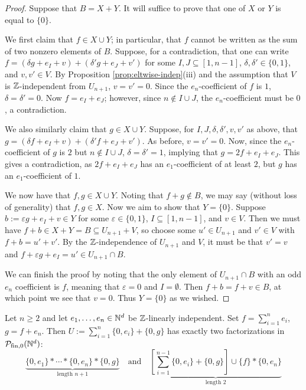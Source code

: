 \begin{proof}
	Suppose that $B = X + Y$.
	It will suffice to prove that one of $X$ or $Y$ is equal to $\{0\}$.

	We first claim that $f\in X\cup Y$; in particular, that $f$ cannot be written as the sum of two nonzero elements of $B$.
	Suppose, for a contradiction, that one can write $f = (\delta g + e_I + v) + (\delta' g + e_J + v')$ for some $I,J\subseteq [1,n-1]$, $\delta,\delta'\in\{0,1\}$, and $v,v'\in V$.
	By Proposition \ref{prop:eltwise-indep}(iii) and the assumption that $V$ is $\mathbb{Z}$-independent from $U_{n+1}$, $v=v' = 0$.
	Since the $e_n$-coefficient of $f$ is $1$, $\delta = \delta' = 0$.
	Now $f = e_I + e_J$; however, since $n\notin I\cup J$, the $e_n$-coefficient must be $0$, a contradiction.
	
	We also similarly claim that $g \in X\cup Y$.  
	Suppose, for $I,J,\delta,\delta',v,v'$ as above, that $g = (\delta f + e_I + v) + (\delta' f + e_J + v')$.
	As before, $v=v'=0$.
	Now, since the $e_n$-coefficient of $g$ is $2$ but $n\notin I\cup J$, $\delta = \delta' = 1$, implying that $g = 2f + e_I + e_J$.
	This gives a contradiction, as $2f + e_I + e_J$ has an $e_1$-coefficient of at least $2$, but $g$ has an $e_1$-coefficient of $1$.
	
	We now have that $f,g\in X \cup Y$.
	Noting that $f+g \notin B$, we may say (without loss of generality) that $f,g\in X$.
	Now we aim to show that $Y = \{0\}$.
	Suppose $b := \varepsilon g + e_I +v \in Y$ for some $\varepsilon \in \{0,1\}$, $I\subseteq [ 1,n-1]$, and $v\in V$.
	Then we must have $f + b \in X+Y = B \subseteq U_{n+1} + V$, so choose some $u'\in U_{n+1}$ and $v'\in V$ with $f + b = u' + v'$.
	By the $\mathbb{Z}$-independence of $U_{n+1}$ and $V$, it must be that $v' = v$ and $f + \varepsilon g + e_I = u' \in U_{n+1} \cap B$.
	
	We can finish the proof by noting that the only element of $U_{n+1}\cap B$ with an odd $e_n$ coefficient is $f$, meaning that $\varepsilon=0$ and $I = \emptyset$.
	Then $f+b = f+v \in B$, at which point we see that $v = 0$.
	Thus $Y = \{0\}$ as we wished.
\end{proof}

\begin{thm} \label{thm:2n-length-set}
	Let $n\ge 2$ and let $e_1,\dots, e_n\in \mathbb{N}^d$ be $\mathbb{Z}$-linearly independent.
	Set $f = \sum_{i=1}^n e_i$, $g=f+e_n$.
	Then $U := \sum_{i=1}^n \{0,e_i\} + \{0,g\}$ has exactly two factorizations in $\mathcal{P}_{\textrm{fin}, 0}(\mathbb{N}^d)$:
	\[ \underbrace{\{0,e_1\}*\cdots*\{0,e_n\}*\{0,g\}}_{\textrm{length } n+1} \quad \textrm{and}\quad \underbrace{\left[\sum_{i=1}^{n-1}\{0,e_i\}+\{0,g\}\right]\cup\{f\} * \{0,e_n\}}_{\textrm{length } 2} \]
\end{thm}

